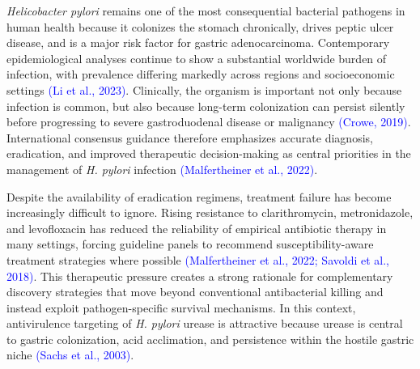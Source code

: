 \documentclass[11pt]{article}
\begin{document}
\textit{Helicobacter pylori} remains one of the most consequential bacterial pathogens in human health because it colonizes the stomach chronically, drives peptic ulcer disease, and is a major risk factor for gastric adenocarcinoma. Contemporary epidemiological analyses continue to show a substantial worldwide burden of infection, with prevalence differing markedly across regions and socioeconomic settings \textcolor{blue}{(Li et al., 2023)}. Clinically, the organism is important not only because infection is common, but also because long-term colonization can persist silently before progressing to severe gastroduodenal disease or malignancy \textcolor{blue}{(Crowe, 2019)}. International consensus guidance therefore emphasizes accurate diagnosis, eradication, and improved therapeutic decision-making as central priorities in the management of \textit{H. pylori} infection \textcolor{blue}{(Malfertheiner et al., 2022)}.

Despite the availability of eradication regimens, treatment failure has become increasingly difficult to ignore. Rising resistance to clarithromycin, metronidazole, and levofloxacin has reduced the reliability of empirical antibiotic therapy in many settings, forcing guideline panels to recommend susceptibility-aware treatment strategies where possible \textcolor{blue}{(Malfertheiner et al., 2022; Savoldi et al., 2018)}. This therapeutic pressure creates a strong rationale for complementary discovery strategies that move beyond conventional antibacterial killing and instead exploit pathogen-specific survival mechanisms. In this context, antivirulence targeting of \textit{H. pylori} urease is attractive because urease is central to gastric colonization, acid acclimation, and persistence within the hostile gastric niche \textcolor{blue}{(Sachs et al., 2003)}.
\end{document}
